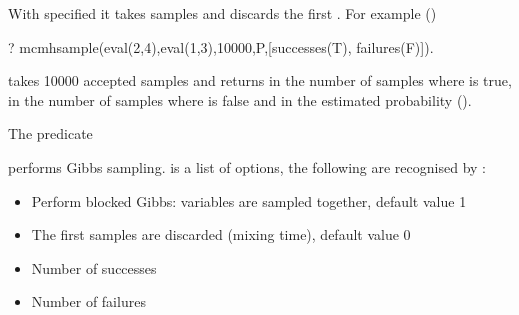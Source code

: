 \documentclass[letterpaper,10pt,english]{sphinxmanual}
\begin{document}
With  specified it takes  samples and discards the first .
For example ()

\begin{sphinxVerbatim}[commandchars=\\\{\}]
?\PYGZhy{} mc\PYGZus{}mh\PYGZus{}sample(eval(2,4),eval(1,3),10000,P,[successes(T), failures(F)]).
\end{sphinxVerbatim}

takes 10000 accepted samples and returns in  the number of samples where  is true,
in  the number of samples where  is false and in  the estimated probability ().

The predicate

\begin{sphinxVerbatim}[commandchars=\\\{\}]
  
\end{sphinxVerbatim}

performs Gibbs sampling.  is a list of options, the following are recognised by :
\begin{itemize}
\item {} 
 Perform blocked Gibbs:  variables are sampled together, default value 1

\item {} 
 The first  samples are discarded (mixing time), default value 0

\item {} 
 Number of successes

\item {} 
 Number of failures

\end{itemize}
\end{document}
